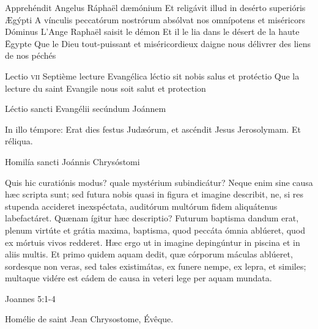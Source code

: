 \documentclass[twoside]{article}
\begin{document}
\begin{paracol}[1]{2}

\begin{enumerate}[wide, itemsep=0mm, labelwidth=!, labelindent=0pt, label=\color{gregoriocolor}\theenumi]


\end{enumerate}

\switchcolumn*

\versiculusabsolutio
	{Apprehéndit Angelus Ráphaël dæmónium}
	{Et religávit illud in desérto superióris Ægýpti}
	{A vínculis peccatórum nostrórum absólvat nos omnípotens et miséricors Dóminus}
	{L’Ange Raphaël saisit le démon}
	{Et il le lia dans le désert de la haute Ëgypte}
	{Que le Dieu tout-puissant et miséricordieux daigne nous délivrer des liens de nos péchés}

\lectioresponsorium
	{Lectio \textsc{vii}}
	{Septième lecture}
	{Evangélica léctio sit nobis salus et protéctio}
	{Que la lecture du saint Evangile nous soit salut et protection}
	{
		Léctio sancti Evangélii secúndum Joánnem
		
		In illo témpore: Erat dies festus Judæórum, et ascéndit Jesus Jerosolymam. Et réliqua.
		
		Homilía sancti Joánnis Chrysóstomi

		Quis hic curatiónis modus? quale mystérium subindicátur? Neque enim sine causa hæc scripta sunt; sed futura nobis quasi in figura et imagine describit, ne, si res stupenda accideret inexspéctata, auditórum multórum fidem aliquátenus labefactáret. Quænam ígitur hæc descriptio? Futurum baptisma dandum erat, plenum virtúte et grátia maxima, baptisma, quod peccáta ómnia ablúeret, quod ex mórtuis vivos redderet. Hæc ergo ut in imagine depingúntur in piscina et in aliis multis. Et primo quidem aquam dedit, quæ córporum máculas ablúeret, sordesque non veras, sed tales existimátas, ex funere nempe, ex lepra, et similes; multaque vidére est eádem de causa in veteri lege per aquam mundata.
	}
	{
		Joannes 5:1-4
		
		Homélie de saint Jean Chrysostome, Évêque.
		
		
}
\end{paracol}
\end{document}
